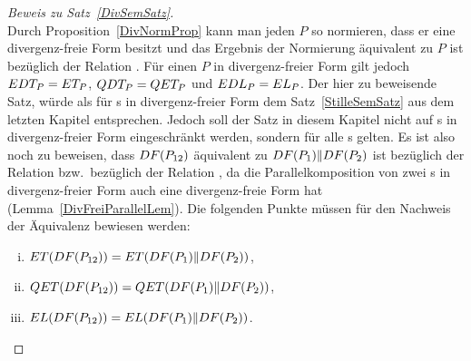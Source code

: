 \begin{proof}[Beweis zu Satz~\ref{DivSemSatz}]\mbox{}\\
  Durch Proposition~\ref{DivNormProp} kann man jeden \MEIO{} $P$ so normieren,
  dass er eine divergenz-freie Form besitzt und das Ergebnis der Normierung
  äquivalent zu $P$ ist bezüglich der Relation \DRel{}. Für einen \MEIO{} $P$
  in divergenz-freier Form gilt jedoch $EDT _P = ET _P$, $QDT _P = QET _P$
  und $EDL _P = EL _P$. Der hier zu beweisende Satz, würde als für \MEIO{}s
  in divergenz-freier Form dem Satz~\ref{StilleSemSatz} aus dem letzten Kapitel
  entsprechen. Jedoch soll der Satz in diesem Kapitel nicht auf \MEIO{}s in
  divergenz-freier Form eingeschränkt werden, sondern für alle \MEIO{}s gelten.
  Es ist also noch zu beweisen, dass $DF (P_{12})$ äquivalent zu $DF
  (P_1)\|DF (P_2)$ ist bezüglich der Relation \DRel{} bzw.\ bezüglich der
  Relation \QRel{}, da die Parallelkomposition von zwei \MEIO{}s in
  divergenz-freier Form auch eine divergenz-freie Form hat
  (Lemma~\ref{DivFreiParallelLem}). Die folgenden Punkte müssen für den
  Nachweis der Äquivalenz bewiesen werden:
  \begin{enumerate}[(i)]
    \item $ET (DF (P_{12})) = ET (DF (P_1)\|DF (P_2))$,
    \item $QET (DF (P_{12})) = QET (DF (P_1)\|DF (P_2))$,
    \item $EL (DF (P_{12})) = EL (DF (P_1)\|DF (P_2))$.
  \end{enumerate}


\end{proof}

